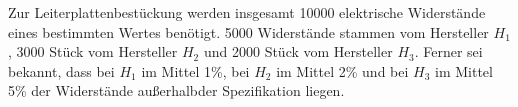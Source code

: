 \documentclass{abgabe}
\begin{document}
\begin{questions}
    \question
    Zur Leiterplattenbestückung werden insgesamt \num{10000} elektrische Widerstände eines bestimmten Wertes benötigt.
    \num{5000} Widerstände stammen vom Hersteller $H_1$, \num{3000} Stück vom Hersteller $H_2$ und \num{2000} Stück vom Hersteller $H_3$. 
    Ferner sei bekannt, dass bei $H_1$ im Mittel 1\%, bei $H_2$ im Mittel 2\% und bei $H_3$ im Mittel 5\% der Widerstände außerhalbder Spezifikation liegen.
\end{questions}
\end{document}
